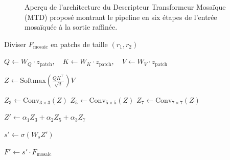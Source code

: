 \documentclass[conference]{IEEEtran}
\begin{document}
\begin{figure}[h!]
\begin{center}
\caption{Aperçu de l'architecture du Descripteur Transformeur Mosaïque (MTD) proposé montrant le pipeline en six étapes de l'entrée mosaïquée à la sortie raffinée.}
\label{fig:mtd_architecture}
\end{center}
\end{figure}

\begin{algorithm}[h!]
\caption{Descripteur Transformeur Mosaïque (MTD)}

Diviser $F_{\text{mosaic}}$ en patchs de taille $(r_1, r_2)$\;


$Q \leftarrow W_Q \cdot z_{\text{patch}}, \quad K \leftarrow W_K \cdot z_{\text{patch}}, \quad V \leftarrow W_V \cdot z_{\text{patch}}$\;

$Z \leftarrow \text{Softmax}\left(\frac{QK^\top}{\sqrt{d}}\right) V$\;

$Z_3 \leftarrow \text{Conv}_{3\times3}(Z)$\;
$Z_5 \leftarrow \text{Conv}_{5\times5}(Z)$\;
$Z_7 \leftarrow \text{Conv}_{7\times7}(Z)$\;

$Z' \leftarrow \alpha_1 Z_3 + \alpha_2 Z_5 + \alpha_3 Z_7$\;

$s' \leftarrow \sigma(W_s Z')$\;

$F' \leftarrow s' \cdot F_{\text{mosaic}}$\;

\;

\end{algorithm}
\end{document}
